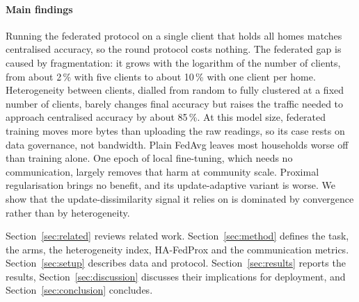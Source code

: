 \paragraph{Main findings}
Running the federated protocol on a single client that holds all homes matches centralised accuracy, so the round
protocol costs nothing. The federated gap is caused by fragmentation: it grows with the logarithm of the number of
clients, from about 2\,\% with five clients to about 10\,\% with one client per home. Heterogeneity between clients,
dialled from random to fully clustered at a fixed number of clients, barely changes final accuracy but raises the
traffic needed to approach centralised accuracy by about 85\,\%. At this model size, federated training moves more
bytes than uploading the raw readings, so its case rests on data governance, not bandwidth. Plain FedAvg leaves most
households worse off than training alone. One epoch of local fine-tuning, which needs no communication, largely
removes that harm at community scale. Proximal regularisation brings no benefit, and its update-adaptive variant is
worse. We show that the update-dissimilarity signal it relies on is dominated by convergence rather than by
heterogeneity.

Section~\ref{sec:related} reviews related work. Section~\ref{sec:method} defines the task, the arms, the
heterogeneity index, HA-FedProx and the communication metrics. Section~\ref{sec:setup} describes data and protocol.
Section~\ref{sec:results} reports the results, Section~\ref{sec:discussion} discusses their implications for
deployment, and Section~\ref{sec:conclusion} concludes.
